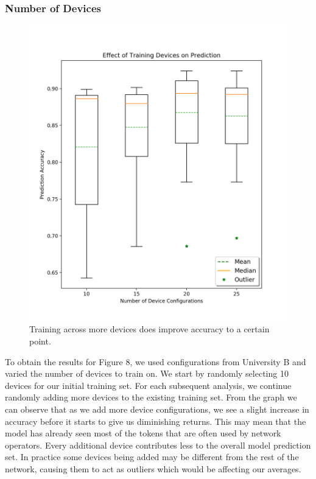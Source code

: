 \subsubsection{Number of Devices}
\begin{figure}[H]
	\centering
	\includegraphics[width=\textwidth]{device_analysis.png}
	\caption{Training across more devices does improve accuracy to a certain point.}
\end{figure}

To obtain the results for Figure 8, we used configurations from University B and varied the number of devices to train on. We start by randomly selecting 10 devices for our initial training set. For each subsequent analysis, we continue randomly adding more devices to the existing training set. From the graph we can observe that as we add more device configurations, we see a slight increase in accuracy before it starts to give us diminishing returns. This may mean that the model has already seen most of the tokens that are often used by network operators. Every additional device contributes less to the overall model prediction set. In practice some devices being added may be different from the rest of the network, causing them to act as outliers which would be affecting our averages.

